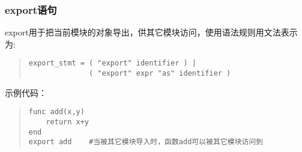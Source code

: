 \subsubsection{export语句}
export用于把当前模块的对象导出，供其它模块访问，使用语法规则用文法表示为:
\begin{quote}
\begin{verbatim}
export_stmt = ( "export" identifier ) |
              ( "export" expr "as" identifier )
\end{verbatim}
\end{quote}
示例代码：
\begin{quote}
\begin{verbatim}
func add(x,y)
    return x+y
end 
export add    #当被其它模块导入时，函数add可以被其它模块访问到
\end{verbatim}
\end{quote}













